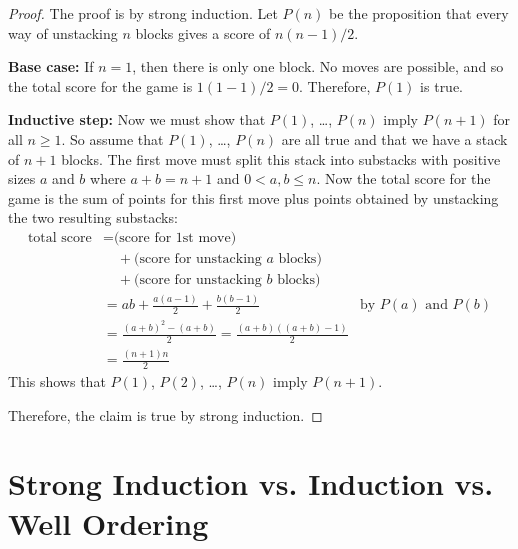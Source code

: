 \begin{proof}
The proof is by strong induction.  Let $P(n)$ be the proposition that
every way of unstacking $n$ blocks gives a score of $n(n-1)/2$.

\textbf{Base case:} If $n = 1$, then there is only one
block.  No moves are possible, and so the total score for the game is
$1(1 - 1)/2 = 0$.  Therefore, $P(1)$ is true.

\textbf{Inductive step:} Now we must show that $P(1)$, \dots, $P(n)$ imply
$P(n+1)$ for all $n \geq 1$.  So assume that $P(1)$, \dots, $P(n)$ are all
true and that we have a stack of $n+1$ blocks.  The first move must split
this stack into substacks with positive sizes $a$ and $b$ where $a+b =
n+1$ and $0<a,b\leq n$.  Now the total score for the game is the sum of
points for this first move plus points obtained by unstacking the two
resulting substacks:
%
\begin{align*}
\text{total score}
    & = \text{(score for 1st move)} \\
    & \quad + \text{(score for unstacking $a$ blocks)} \\
    & \quad + \text{(score for unstacking $b$ blocks)} \\
    & = ab + \frac{a(a-1)}{2} + \frac{b(b-1)}{2} & \text{by $P(a)$ and $P(b)$}\\
    & = \frac{(a+b)^2-(a+b)}{2} = \frac{(a+b)((a+b)-1)}{2}\\
    & = \frac{(n+1)n}{2}
\end{align*}
%
This shows that $P(1)$, $P(2)$, \dots, $P(n)$ imply $P(n+1)$.

Therefore, the claim is true by strong induction.
\end{proof}
\fi

\begin{problems}
\classproblems
{}
\homeworkproblems
{}

\end{problems}

\section{Strong Induction vs.  Induction vs.  Well Ordering}
\label{versusWO}

